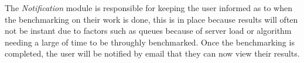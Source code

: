 The \textit{Notification} module is responsible for keeping the user informed 
as to when the benchmarking on their work is done, this is in place because
results will often not be instant due to factors such as queues because of server
load or algorithm needing a large of time to be throughly benchmarked. Once the
benchmarking is completed, the user will be notified by email that they can now
view their results.